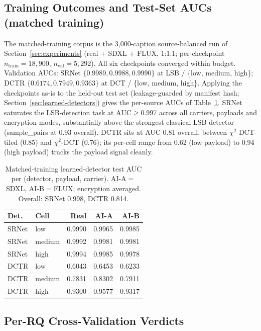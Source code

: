 \documentclass[10pt,twocolumn,a4paper]{article}
\begin{document}
\subsection{Training Outcomes and Test-Set AUCs (matched training)}
\label{sec:v1-train}

The matched-training corpus is the 3{,}000-caption source-balanced run of Section~\ref{sec:experiments} (real + SDXL + FLUX, 1:1:1; per-checkpoint $n_\text{train}\!=\!18{,}900$, $n_\text{val}\!=\!5{,}292$). All six checkpoints converged within budget. Validation AUCs: SRNet $\{0.9989, 0.9988, 0.9990\}$ at LSB / \{low, medium, high\}; DCTR $\{0.6174, 0.7949, 0.9363\}$ at DCT / \{low, medium, high\}. Applying the checkpoints as-is to the held-out test set (leakage-guarded by manifest hash; Section~\ref{sec:learned-detectors}) gives the per-source AUCs of Table~\ref{tab:learned-headline-auc}. SRNet saturates the LSB-detection task at AUC$\geq$0.997 across all carriers, payloads and encryption modes, substantially above the strongest classical LSB detector (sample\_pairs at 0.93 overall). DCTR sits at AUC 0.81 overall, between $\chi^2$-DCT-tiled (0.85) and $\chi^2$-DCT (0.76); its per-cell range from 0.62 (low payload) to 0.94 (high payload) tracks the payload signal cleanly.

\begin{table}[!htbp]
\centering\footnotesize
\caption{Matched-training learned-detector test AUC per (detector, payload, carrier). AI-A$=$SDXL, AI-B$=$FLUX; encryption averaged. Overall: SRNet 0.998, DCTR 0.814.}
\label{tab:learned-headline-auc}
\setlength{\tabcolsep}{5pt}\renewcommand{\arraystretch}{1.05}
\begin{tabular}{@{}llrrr@{}}
\toprule
\textbf{Det.} & \textbf{Cell} & \textbf{Real} & \textbf{AI-A} & \textbf{AI-B} \\
\midrule
SRNet & low     & 0.9990 & 0.9965 & 0.9985 \\
SRNet & medium  & 0.9992 & 0.9981 & 0.9981 \\
SRNet & high    & 0.9994 & 0.9985 & 0.9978 \\
DCTR  & low     & 0.6043 & 0.6453 & 0.6233 \\
DCTR  & medium  & 0.7831 & 0.8302 & 0.7911 \\
DCTR  & high    & 0.9300 & 0.9577 & 0.9317 \\
\bottomrule
\end{tabular}
\end{table}

\subsection{Per-RQ Cross-Validation Verdicts}
\end{document}
